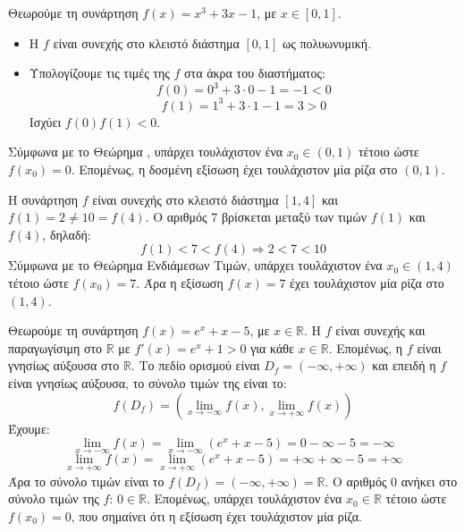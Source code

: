 
\lysh
Θεωρούμε τη συνάρτηση $f(x) = x^3 + 3x - 1$, με $x \in [0, 1]$.
\begin{itemize}
    \item Η $f$ είναι συνεχής στο κλειστό διάστημα $[0, 1]$ ως πολυωνυμική.
    \item Υπολογίζουμε τις τιμές της $f$ στα άκρα του διαστήματος:
    \[ f(0) = 0^3 + 3\cdot 0 - 1 = -1 < 0 \]
    \[ f(1) = 1^3 + 3\cdot 1 - 1 = 3 > 0 \]
    Ισχύει $f(0)f(1) < 0$.
\end{itemize}
Σύμφωνα με το Θεώρημα , υπάρχει τουλάχιστον ένα $x_0 \in (0, 1)$ τέτοιο ώστε $f(x_0) = 0$.
Επομένως, η δοσμένη εξίσωση έχει τουλάχιστον μία ρίζα στο $(0, 1)$.\\


\lysh
Η συνάρτηση $f$ είναι συνεχής στο κλειστό διάστημα $[1, 4]$ και $f(1) = 2 \neq 10 = f(4)$.
Ο αριθμός $7$ βρίσκεται μεταξύ των τιμών $f(1)$ και $f(4)$, δηλαδή:
\[ f(1) < 7 < f(4) \Rightarrow 2 < 7 < 10 \]
Σύμφωνα με το Θεώρημα Ενδιάμεσων Τιμών, υπάρχει τουλάχιστον ένα $x_0 \in (1, 4)$ τέτοιο ώστε $f(x_0) = 7$.
Άρα η εξίσωση $f(x) = 7$ έχει τουλάχιστον μία ρίζα στο $(1, 4)$.\\


\lysh
Θεωρούμε τη συνάρτηση $f(x) = e^x + x - 5$, με $x \in \mathbb{R}$.
Η $f$ είναι συνεχής και παραγωγίσιμη στο $\mathbb{R}$ με $f'(x) = e^x + 1 > 0$ για κάθε $x \in \mathbb{R}$. 
Επομένως, η $f$ είναι γνησίως αύξουσα στο $\mathbb{R}$.
Το πεδίο ορισμού είναι $D_f = (-\infty, +\infty)$ και επειδή η $f$ είναι γνησίως αύξουσα, το σύνολο τιμών της είναι το:
\[ f(D_f) = \left(\lim_{x \to -\infty} f(x), \lim_{x \to +\infty} f(x)\right) \]
Έχουμε:
\[ \lim_{x \to -\infty} f(x) = \lim_{x \to -\infty} (e^x + x - 5) = 0 - \infty - 5 = -\infty \]
\[ \lim_{x \to +\infty} f(x) = \lim_{x \to +\infty} (e^x + x - 5) = +\infty + \infty - 5 = +\infty \]
Άρα το σύνολο τιμών είναι το $f(D_f) = (-\infty, +\infty) = \mathbb{R}$.
Ο αριθμός $0$ ανήκει στο σύνολο τιμών της $f$: $0 \in \mathbb{R}$. Επομένως, υπάρχει τουλάχιστον ένα $x_0 \in \mathbb{R}$ τέτοιο ώστε $f(x_0) = 0$, που σημαίνει ότι η εξίσωση έχει τουλάχιστον μία ρίζα.\\

